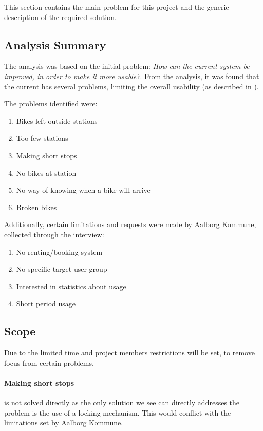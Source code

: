 This section contains the main problem for this project and the generic description of the required solution.

\subsection{Analysis Summary}
The analysis was based on the initial problem: \textit{How can the current \citybike system be improved, in order to make it more usable?}.
From the analysis, it was found that the current \citybike has several problems, limiting the overall usability (as described in ).

The problems identified were:
\begin{enumerate}
\item Bikes left outside stations \label{pr_stations}
\item Too few stations \label{pr_few}
\item Making short stops \label{pr_stops}
\item No bikes at station \label{pr_nobikes}
\item No way of knowing when a bike will arrive \label{pr_arrive}
\item Broken bikes \label{pr_broken}
\end{enumerate}

Additionally, certain limitations and requests were made by Aalborg Kommune, collected through the interview:

\begin{enumerate}
\item No renting/booking system
\item No specific target user group
\item Interested in statistics about usage
\item Short period usage
\end{enumerate}

\subsection{Scope}
Due to the limited time and project members restrictions will be set, to remove focus from certain problems.

\paragraph{Making short stops} is not solved directly as the only solution we see can directly addresses the problem is the use of a locking mechanism.
This would conflict with the limitations set by Aalborg Kommune.

